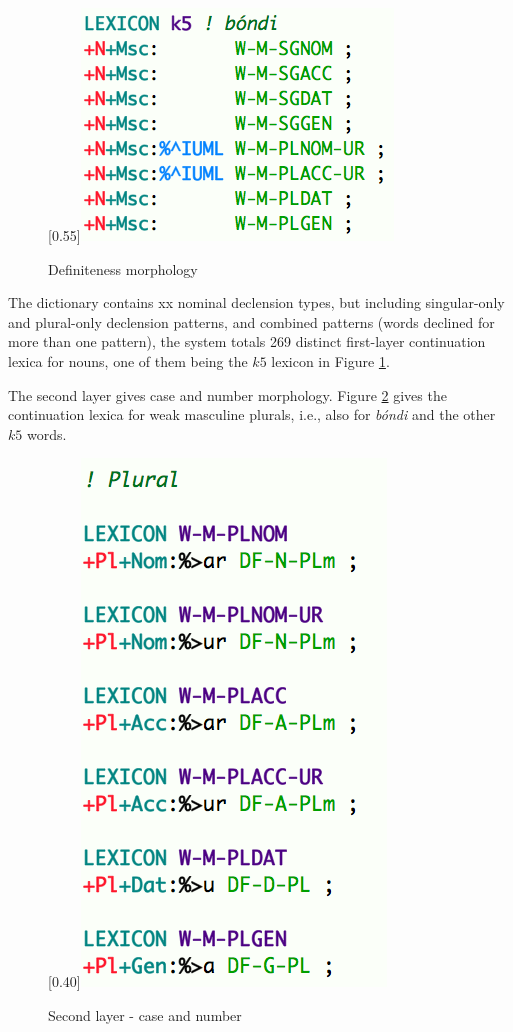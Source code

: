 \documentclass[11pt]{article}
\begin{document}
\begin{figure}[hp]
\begin{center}
\scalebox{0.55}[0.55]{\includegraphics{img/bondi.png}}
\caption{Definiteness morphology}
\label{bondi}
\end{center}
\end{figure}

The dictionary contains xx nominal declension types, but including singular-only and plural-only declension patterns, and combined patterns (words declined for more than one pattern), the system totals 269 distinct first-layer continuation lexica for nouns, one of them being the $k5$ lexicon in Figure \ref{bondi}.

The second layer gives case and number morphology. Figure \ref{wmplnom} gives the continuation lexica for weak masculine plurals, i.e., also for \textit{bóndi} and the other $k5$ words. 
 
\begin{figure}[hp]
\begin{center}
\scalebox{0.40}[0.40]{\includegraphics{img/wmplnom.png}}
\caption{Second layer - case and number}
\label{wmplnom}
\end{center}
\end{figure}
\end{document}
